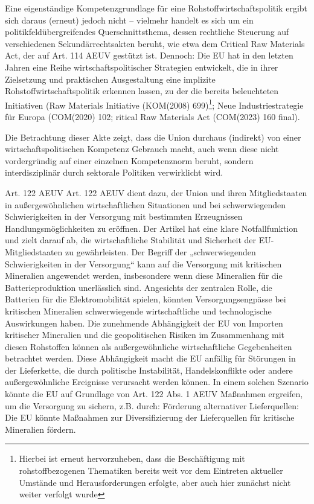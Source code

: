 \documentclass[12pt,a4paper,oneside]{book} %
\begin{document}
Eine eigenständige Kompetenzgrundlage für eine Rohstoffwirtschaftspolitik ergibt sich daraus (erneut) jedoch nicht – vielmehr handelt es sich um ein politikfeldübergreifendes Querschnittsthema, dessen rechtliche Steuerung auf verschiedenen Sekundärrechtsakten beruht, wie etwa dem Critical Raw Materials Act, der auf Art. 114 AEUV gestützt ist. Dennoch: Die EU hat in den letzten Jahren eine Reihe wirtschaftspolitischer Strategien entwickelt, die in ihrer Zielsetzung und praktischen Ausgestaltung eine implizite Rohstoffwirtschaftspolitik erkennen lassen, zu der die bereits beleuchteten Initiativen (Raw Materials Initiative (KOM(2008) 699)\footnote{Hierbei ist erneut hervorzuheben, dass die Beschäftigung mit rohstoffbezogenen Thematiken bereits weit vor dem Eintreten aktueller Umstände und Herausforderungen erfolgte, aber auch hier zunächst nicht weiter verfolgt wurde}; Neue Industriestrategie für Europa (COM(2020) 102; ritical Raw Materials Act (COM(2023) 160 final).

Die Betrachtung dieser Akte zeigt, dass die Union durchaus (indirekt) von einer wirtschaftspolitischen Kompetenz Gebrauch macht, auch wenn diese nicht vordergründig auf einer einzelnen Kompetenznorm beruht, sondern interdisziplinär durch sektorale Politiken verwirklicht wird.
	
	
	
Art. 122 AEUV
Art. 122 AEUV dient dazu, der Union und ihren Mitgliedstaaten in außergewöhnlichen wirtschaftlichen Situationen und bei schwerwiegenden Schwierigkeiten in der Versorgung mit bestimmten Erzeugnissen Handlungsmöglichkeiten zu eröffnen. Der Artikel hat eine klare Notfallfunktion und zielt darauf ab, die wirtschaftliche Stabilität und Sicherheit der EU-Mitgliedstaaten zu gewährleisten. Der Begriff der „schwerwiegenden Schwierigkeiten in der Versorgung“ kann auf die Versorgung mit kritischen Mineralien angewendet werden, insbesondere wenn diese Mineralien für die Batterieproduktion unerlässlich sind. Angesichts der zentralen Rolle, die Batterien für die Elektromobilität spielen, könnten Versorgungsengpässe bei kritischen Mineralien schwerwiegende wirtschaftliche und technologische Auswirkungen haben. Die zunehmende Abhängigkeit der EU von Importen kritischer Mineralien und die geopolitischen Risiken im Zusammenhang mit diesen Rohstoffen können als außergewöhnliche wirtschaftliche Gegebenheiten betrachtet werden. Diese Abhängigkeit macht die EU anfällig für Störungen in der Lieferkette, die durch politische Instabilität, Handelskonflikte oder andere außergewöhnliche Ereignisse verursacht werden können.  In einem solchen Szenario könnte die EU auf Grundlage von Art. 122 Abs. 1 AEUV Maßnahmen ergreifen, um die Versorgung zu sichern, z.B. durch: Förderung alternativer Lieferquellen: Die EU könnte Maßnahmen zur Diversifizierung der Lieferquellen für kritische Mineralien fördern.
\end{document}
